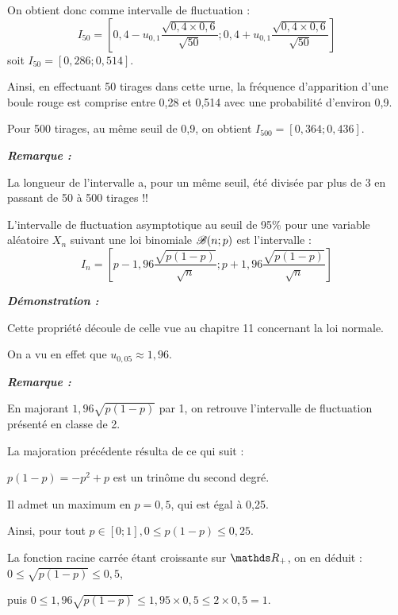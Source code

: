 \documentclass[12pt,french]{article}
\begin{document}
\begin{spacing}{1.2}
On obtient donc comme intervalle de fluctuation :
\[I_{50}=\left[0,4-u_{0,1}\frac{\sqrt{0,4\times 0,6}}{\sqrt{50}};0,4+u_{0,1}\frac{\sqrt{0,4\times 0,6}}{\sqrt{50}}\right]\]
soit $I_{50}=[0,286;0,514]$.

Ainsi, en effectuant 50 tirages dans cette urne, la fréquence d'apparition d'une boule rouge est comprise entre 0,28 et 0,514 avec une probabilité d'environ 0,9.

Pour 500 tirages, au même seuil de 0,9, on obtient $I_{500}=[0,364;0,436]$.

\medskip

\textbf{\textit{Remarque :}}

La longueur de l'intervalle a, pour un même seuil, été divisée par plus de 3 en passant de 50 à 500 tirages \quad !!

\medskip

\begin{propr}

L'intervalle de fluctuation asymptotique au seuil de 95\% pour une variable aléatoire $X_n$ suivant une loi binomiale $\mathscr{B}(n;p)$ est l'intervalle :
\[I_n=\left[p-1,96\frac{\sqrt{p(1-p)}}{\sqrt{n}};p+1,96\frac{\sqrt{p(1-p)}}{\sqrt{n}}\right]\]

\end{propr}

\bigskip

\textbf{\textit{Démonstration :}}

Cette propriété découle de celle vue au chapitre 11 concernant la loi normale.

On a vu en effet que $u_{0,05}\approx 1,96$.

\medskip

\textbf{\textit{Remarque :}}

En majorant $1,96\sqrt{p(1-p)}$ par 1, on retrouve l'intervalle de fluctuation présenté en classe de 2.

La majoration précédente résulta de ce qui suit :

$p(1-p)=-p^2+p$ est un trinôme du second degré.

Il admet un maximum en $p=0,5$, qui est égal à 0,25.

Ainsi, pour tout $p\in [0;1], 0\leq p(1-p)\leq 0,25$.

La fonction racine carrée étant croissante sur $\R_+$, on en déduit : $0\leq \sqrt{p(1-p)}\leq 0,5$, 

puis $0\leq 1,96\sqrt{p(1-p)}\leq 1,95\times 0,5\leq 2\times 0,5=1$.


\end{spacing}
\end{document}
